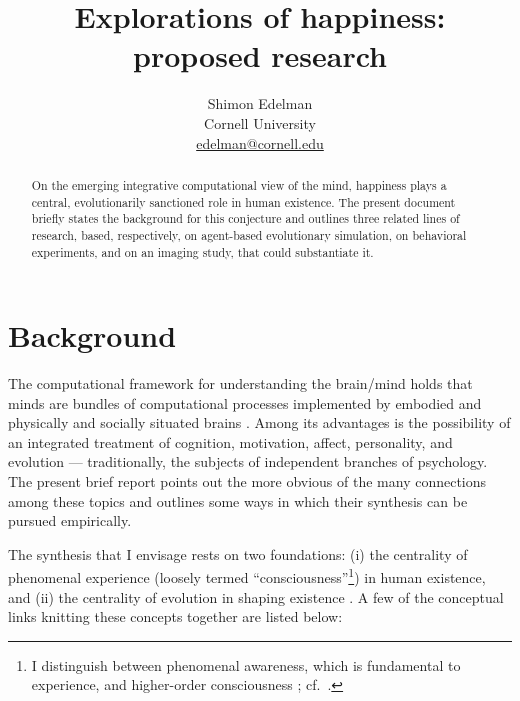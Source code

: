 \documentclass[11pt]{article}
\begin{document}

  \title{Explorations of happiness: proposed research}

  \author{Shimon Edelman \\ Cornell University \\ \href{mailto:edelman@cornell.edu}{edelman@cornell.edu}}

  \maketitle
  
  \begin{abstract}

    On the emerging integrative computational view of the mind,
    happiness plays a central, evolutionarily sanctioned role in human
    existence. The present document briefly states the background for
    this conjecture and outlines three related lines of research,
    based, respectively, on agent-based evolutionary simulation, on
    behavioral experiments, and on an imaging study, that could
    substantiate it.

  \end{abstract}

\section{Background}

The computational framework for understanding the brain/mind holds
that minds are bundles of computational processes implemented by
embodied and physically and socially situated brains
\citep{Edelman08book}. Among its advantages is the possibility of an
integrated treatment of cognition, motivation, affect, personality,
and evolution --- traditionally, the subjects of independent branches
of psychology. The present brief report points out the more obvious of
the many connections among these topics and outlines some ways in
which their synthesis can be pursued empirically. 

The synthesis that I envisage rests on two foundations: (i) the
centrality of phenomenal experience (loosely termed
``consciousness''\footnote{I distinguish between phenomenal awareness,
  which is fundamental to experience, and higher-order consciousness
  \citep[ch.9]{Edelman08book}; cf.\ \citep{FeketeEdelman11}.}) in
human existence, and (ii) the centrality of evolution in shaping
existence \citep{Dobzhansky73}. A few of the conceptual links knitting
these concepts together are listed below:
\end{document}

